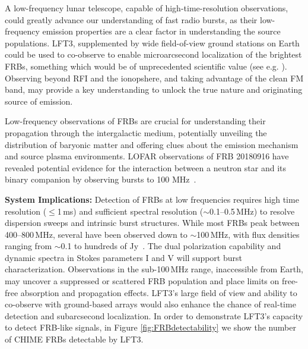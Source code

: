 A low-frequency lunar telescope, capable of high-time-resolution observations, could greatly advance our understanding of fast radio bursts, as their low-frequency emission properties are a clear factor in understanding the source populations. LFT3, supplemented by wide field-of-view ground stations on Earth could be used to co-observe to enable microarcsecond localization of the brightest FRBs, something which would be of unprecedented scientific value (see e.g. \citealt{nimmo_burst_2023}). 
Observing beyond RFI and the ionopshere, and taking advantage of the clean FM band, may provide a key understanding to unlock the true nature and originating source of emission.

Low-frequency observations of FRBs are crucial for understanding their propagation through the intergalactic medium, potentially unveiling the distribution of baryonic matter and offering clues about the emission mechanism and source plasma environments. LOFAR observations of FRB 20180916 have revealed potential evidence for the interaction between a neutron star and its binary companion by observing bursts to 100 MHz~\citep{pleunis2021lofar}.

\textbf{System Implications:} Detection of FRBs at low frequencies requires high time resolution ($\leq$1\,ms) and sufficient spectral resolution ($\sim$0.1--0.5\,MHz) to resolve dispersion sweeps and intrinsic burst structures. While most FRBs peak between 400--800\,MHz, several have been observed down to $\sim$100\,MHz, with flux densities ranging from $\sim$0.1 to hundreds of Jy~\citep{pleunis2021lofar}. The dual polarization capability and dynamic spectra in Stokes parameters I and V will support burst characterization. Observations in the sub-100\,MHz range, inaccessible from Earth, may uncover a suppressed or scattered FRB population and place limits on free-free absorption and propagation effects. LFT3's large field of view and ability to co-observe with ground-based arrays would also enhance the chance of real-time detection and subarcsecond localization. In order to demonstrate LFT3's capacity to detect FRB-like signals, in Figure \ref{fig:FRBdetectability} we show the number of CHIME FRBs detectable by LFT3. 



